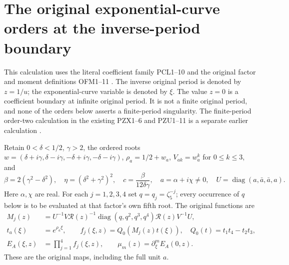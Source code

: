\documentclass[11pt]{article}
\begin{document}
\section{The original exponential-curve orders at the inverse-period boundary}
This calculation uses the literal coefficient family PCL1--10 and the
original factor and moment definitions OFM1--11
\cite{PCLOriginal,NC,Cumulative}. The inverse original period is denoted
by $z=1/u$; the exponential-curve variable is denoted by $\xi$.
The value $z=0$ is a coefficient boundary at infinite original period.
It is not a finite original period, and none of the orders below asserts
a finite-period singularity. The finite-period order-two calculation in
the existing PZX1--6 and PZU1--11 is a separate earlier calculation
\cite{PeriodZeroOriginal}.

Retain $0<\delta<1/2$, $\gamma>2$, the ordered roots
$w=(\delta+i\gamma,\delta-i\gamma,-\delta+i\gamma,-\delta-i\gamma)$,
$\rho_a=1/2+w_a$, $V_{ak}=w_a^k$ for $0\le k\le3$, and
\[
 \beta=2(\gamma^2-\delta^2),\quad
 \eta=(\delta^2+\gamma^2)^2,\quad c=\frac{\beta}{12\delta\gamma},
 \quad a=\alpha+i\chi\ne0,\quad
 U=\operatorname{diag}(a,\bar a,\bar a,a).
 \tag{OPB1}
\]
Here $\alpha,\chi$ are real. For each $j=1,2,3,4$ set
$q=q_j=\zeta_5^{-j}$; every occurrence of $q$ below is to be evaluated
at that factor's own fifth root. The original functions are
\[
 \begin{split}
 M_j(z)&=U^{-1}V\mathcal R(z)^{-1}
        \operatorname{diag}(q,q^2,q^3,q^4)\mathcal R(z)V^{-1}U,\\
 t_a(\xi)&=e^{\rho_a\xi},\qquad
 f_j(\xi,z)=Q_0(M_j(z)t(\xi)),\quad Q_0(t)=t_1t_4-t_2t_3,\\
 E_A(\xi,z)&=\prod_{j=1}^4f_j(\xi,z),\qquad
 \mu_m(z)=\partial_\xi^m E_A(0,z).
 \end{split}\tag{OPB2}
\]
These are the original maps, including the full unit $a$.
\end{document}
